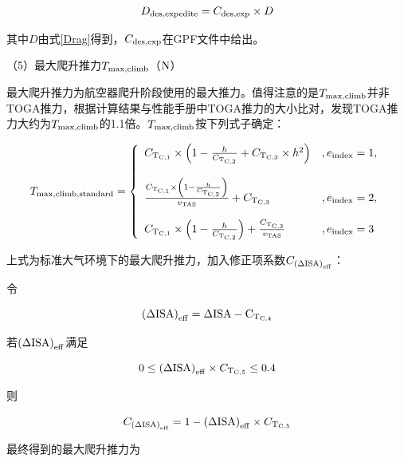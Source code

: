 \documentclass[a4paper,punct,space,heading=true,AutoFakeBold]{ctexrep}
\begin{document}
\begin{equation}\label{Dexp}
D_{\rm des,expedite}=C_{\rm des,exp}\times D
\end{equation}

其中$D$由式\ref{Drag}得到，$C_{\rm des,exp}$在GPF文件中给出。

（5）最大爬升推力$T_{\rm max,climb}$（$\rm N$）

最大爬升推力为航空器爬升阶段使用的最大推力。值得注意的是$T_{\rm max,climb}$并非TOGA推力，根据计算结果与性能手册中TOGA推力的大小比对，发现TOGA推力大约为$T_{\rm max,climb}$的1.1倍。$T_{\rm max,climb}$按下列式子确定：

\begin{equation}
T_{\rm max,climb,standard}=\left\{\begin{array}{ll}
C_{\rm T_{\rm C,1}}\times\left(1-\frac{h}{C_{\rm T_{\rm C,2}}}+C_{\rm T_{\rm C,3}}\times h^2\right)   &   , e_{\rm index}=1,\\        
&\\          
\frac{C_{\rm T_{\rm C,1}}\times \left(1-\frac{h}{C_{\rm T_{\rm C,2}}}\right)}{v_{\rm TAS}}+C_{\rm T_{\rm C,3}}   &   , e_{\rm index}=2,\\     
&\\
C_{\rm T_{\rm C,1}}\times\left(1-\frac{h}{C_{\rm T_{\rm C,2}}}\right)+\frac{C_{\rm T_{\rm C,3}}}{v_{\rm TAS}}   &   , e_{\rm index}=3
\end{array}\right.
\end{equation}

上式为标准大气环境下的最大爬升推力，加入修正项系数$C_{\left(\Delta \rm ISA\right)_{\rm eff}}$：

令

\begin{equation}
\left(\Delta \rm ISA\right)_{\rm eff}=\Delta \rm ISA-C_{\rm T_{\rm C,4}}
\end{equation}

若$\left(\Delta \rm ISA\right)_{\rm eff}$满足

\begin{equation}
0\leq\left(\Delta \rm ISA\right)_{\rm eff}\times C_{\rm T_{\rm C,5}}\leq 0.4
\end{equation}

则

\begin{equation}
C_{\left(\Delta \rm ISA\right)_{\rm eff}}=1-\left(\Delta \rm ISA\right)_{\rm eff}\times C_{\rm T_{\rm C,5}}
\end{equation}

最终得到的最大爬升推力为
\end{document}
